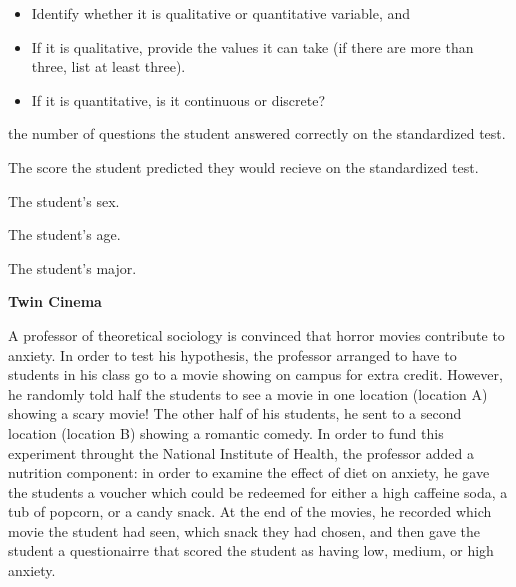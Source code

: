\documentclass[addpoints]{examsetup}\usepackage[]{graphicx}\usepackage[]{color}
\begin{document}
\begin{questions}
\begin{parts}
   \begin{itemize}

      \item Identify whether it is qualitative or quantitative variable, and 

      \item If it is qualitative, provide the values it can take (if there are more than three, list at least three).

      \item If it is quantitative, is it continuous or discrete?

   \end{itemize}

   \begin{subparts}

      \subpart the number of questions the student answered correctly on the standardized test.

      \vspace{2cm}

      \subpart The score the student predicted they would recieve on the standardized test.

      \vspace{2cm}

      \subpart The student's sex.

      \vspace{2cm}

      \subpart The student's age.

      \vspace{2cm}

      \subpart The student's major.

   \end{subparts}

\end{parts}
\pagebreak


\question \textbf{Twin Cinema}

A professor of theoretical sociology is convinced that horror movies contribute to anxiety.
In order to test his hypothesis, the professor arranged to have to students in his class go to a movie showing on campus for extra credit. 
However, he randomly told half the students to see a movie in one location (location A) showing a scary movie!
The other half of his students, he sent to a second location (location B) showing a romantic comedy.
In order to fund this experiment throught the National Institute of Health, the professor added a nutrition component: in order to examine the effect of diet on anxiety, he gave the students a voucher which could be redeemed for either a high caffeine soda, a tub of popcorn, or a candy snack.
At the end of the movies, he recorded which movie the student had seen, which snack they had chosen, and then gave the student a questionairre that scored the student as having low, medium, or high anxiety.


\end{questions}
\end{document}
